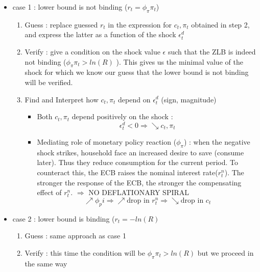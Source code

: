 \documentclass{article}
\begin{document}
\begin{itemize}
    \item case 1 : lower bound is not binding ($r_t = \phi_\pi \pi_t$)
    \begin{enumerate}
        \item Guess : replace guessed $r_t$ in the expression for $c_t, \pi_t$ obtained in step 2, and express the latter as a function of the shock $\epsilon_t^d$
        \item Verify : give a condition on the shock value $\epsilon$ such that the ZLB is indeed not binding ($\phi_\pi \pi_t > ln(R)$ ). This gives us the minimal value of the shock for which we know our guess that the lower bound is not binding will be verified.
        \item Find and Interpret how $c_t,\pi_t$ depend on $\epsilon_t^d$ (sign, magnitude)
        \begin{interpretationbox}
            \begin{itemize}
                \item Both $c_t,\pi_t$ depend positively on the shock : 
                \begin{equation}
                    \epsilon_t^d <0 \Longrightarrow \searrow c_t,\pi_t
                \end{equation}
                \item Mediating role of monetary policy reaction ($\phi_\pi$) : when the negative shock strikes, household face an increased desire to save (consume later). Thus they reduce consumption for the current period. To counteract this, the ECB raises the nominal interest rate($r_t^n$). The stronger the response of the ECB, the stronger the compensating effect of $r_t^n$. $\Longrightarrow$ NO DEFLATIONARY SPIRAL
                \begin{equation}
                    \nearrow \phi_pi \Longrightarrow \nearrow \text{drop in }r_t^n  \Longrightarrow \searrow \text{drop in } c_t
                \end{equation}
            \end{itemize}
        \end{interpretationbox} 
    \end{enumerate}
    \item case 2 : lower bound is binding ($r_t=-ln(R)$
    \begin{enumerate}
        \item Guess : same approach as case 1 
        \item Verify : this time the condition will be $\phi_\pi \pi_t > ln(R)$ but we proceed in the same way

\end{enumerate}
\end{itemize}
\end{document}
